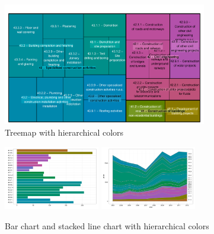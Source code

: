 \documentclass[review]{vgtc}                 %
\begin{document}
\begin{figure}[htb]
  \centering
  \includegraphics[width=3.5in]{treemap_F.pdf}
  \caption{Treemap with hierarchical colors}\label{fig:treemapF}
\end{figure}



\begin{figure}[htb]
  \centering
  \includegraphics[width=1.65in]{bar_chart.pdf}
  \includegraphics[width=1.65in]{stackedline_chart.pdf}
  \caption{Bar chart and stacked line chart with hierarchical colors}\label{fig:charts}
\end{figure}

\end{document}
